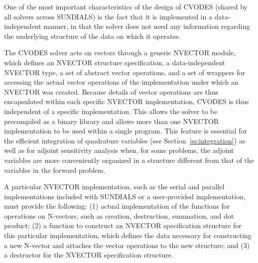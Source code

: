 One of the most important characteristics of the design of CVODES 
(shared by all solvers across SUNDIALS) is the fact that it is implemented 
in a data-independent manner, in that the solver does not need any information
regarding the underlying structure of the data on which it operates.

The CVODES solver acts on vectors through a generic NVECTOR module,
which defines an NVECTOR structure specification, a data-independent
NVECTOR type, a set of abstract vector operations, and a set of
wrappers for accessing the actual vector operations of the
implementation under which an NVECTOR was created. Because details of
vector operations are thus encapsulated within each specific NVECTOR
implementation, CVODES is thus independent of a specific
implementation. This allows the solver to be precompiled as a binary
library and allows more than one NVECTOR implementation to be used
within a single program. This feature is essential for the efficient
integration of quadrature variables (see Section~\ref{ss:integration})
as well as for adjoint sensitivity analysis when, for some problems,
the adjoint variables are more conveniently organized in a structure
different from that of the variables in the forward problem.

A particular NVECTOR implementation, such as the serial and parallel 
implementations included with SUNDIALS or a user-provided implementation,
must provide the following:
(1) actual implementation of the functions for operations on N-vectors, 
such as creation, destruction, summation, and dot product;
(2) a function to construct an NVECTOR specification structure
for this particular implementation, which defines the data necessary
for constructing a new N-vector and attaches the vector operations
to the new structure; and
(3) a destructor for the NVECTOR specification structure.

